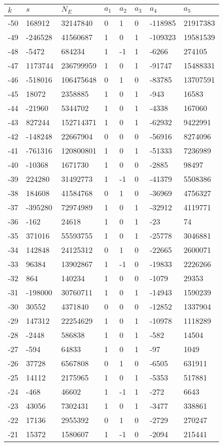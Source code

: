 \documentclass{amsart}
\begin{document}
\begin{longtable}{|l|l|l|lllll|}
\hline
$k$ & $s$ & $N_E$ & $a_1$ & $a_2$ & $a_3$ & $a_4$ & $a_5$\\
\hline
-50&168912&32147840&0&1&0&-118985&21917383\\
-49&-246528&41560687&1&0&1&-109323&19581539\\
-48&-5472&684234&1&-1&1&-6266&274105\\
-47&1173744&236799959&1&0&1&-91747&15488331\\
-46&-518016&106475648&0&1&0&-83785&13707591\\
-45&18072&2358885&1&0&1&-943&16583\\
-44&-21960&5344702&1&0&1&-4338&167060\\
-43&827244&152714371&1&0&1&-62932&9422991\\
-42&-148248&22667904&0&0&0&-56916&8274096\\
-41&-761316&120800801&1&0&1&-51333&7236989\\
-40&-10368&1671730&1&0&0&-2885&98497\\
-39&224280&31492773&1&-1&0&-41379&5508386\\
-38&184608&41584768&0&1&0&-36969&4756327\\
-37&-395280&72974989&1&0&1&-32912&4119771\\
-36&-162&24618&1&0&1&-23&74\\
-35&371016&55593755&1&0&1&-25778&3046881\\
-34&142848&24125312&0&1&0&-22665&2600071\\
-33&96384&13902867&1&-1&0&-19833&2226266\\
-32&864&140234&1&0&0&-1079&29353\\
-31&-198000&30760711&1&0&1&-14943&1590239\\
-30&30552&4371840&0&0&0&-12852&1337904\\
-29&147312&22254629&1&0&1&-10978&1118289\\
-28&-2448&586838&1&0&1&-582&14504\\
-27&-594&64833&1&0&1&-97&1049\\
-26&37728&6567808&0&1&0&-6505&631911\\
-25&14112&2175965&1&0&1&-5353&517881\\
-24&-468&46602&1&-1&1&-272&6643\\
-23&43056&7302431&1&0&1&-3477&338861\\
-22&17136&2955392&0&1&0&-2729&270247\\
-21&15372&1580607&1&-1&0&-2094&215441\\

\end{longtable}
\end{document}
